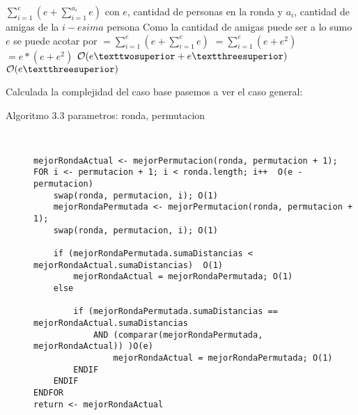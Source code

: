 \begin{center}
    $\sum_{i = 1}^e ( e + \sum_{i = 1}^{a_i} e )$ \newline \newline
    con $e$, cantidad de personas en la ronda y $a_i$, cantidad de amigas de la $i-esima$ persona \newline \newline
Como la cantidad de amigas puede ser a lo sumo $e$ se puede acotar por\newline \newline
    $= \sum_{i = 1}^e ( e + \sum_{i = 1}^{e} e )$ \newline  \newline
    $= \sum_{i = 1}^e ( e + e^2 )$ \newline \newline
    $= e * ( e + e^2 )$ \newline \newline
    $ \bigO(e² + e³ )$ \newline \newline
    $ \bigO( e³ )$ \newline
\end{center}

Calculada la complejidad del caso base pasemos a ver el caso general:

\begin{description}
  \item[Algoritmo 3.3 parametros: ronda, permutacion] \hfill \\
  \begin{verbatim}
mejorRondaActual <- mejorPermutacion(ronda, permutacion + 1);
FOR i <- permutacion + 1; i < ronda.length; i++  O(e - permutacion)
    swap(ronda, permutacion, i); O(1)
    mejorRondaPermutada <- mejorPermutacion(ronda, permutacion + 1);
    swap(ronda, permutacion, i); O(1)
    
    if (mejorRondaPermutada.sumaDistancias < mejorRondaActual.sumaDistancias)  O(1)
    	mejorRondaActual = mejorRondaPermutada; O(1)
    else
    
        if (mejorRondaPermutada.sumaDistancias ==  mejorRondaActual.sumaDistancias  
            AND (comparar(mejorRondaPermutada, mejorRondaActual)) )O(e)
            	mejorRondaActual = mejorRondaPermutada; O(1)
        ENDIF
    ENDIF
ENDFOR
return <- mejorRondaActual
    \end{verbatim}
\end{description}

